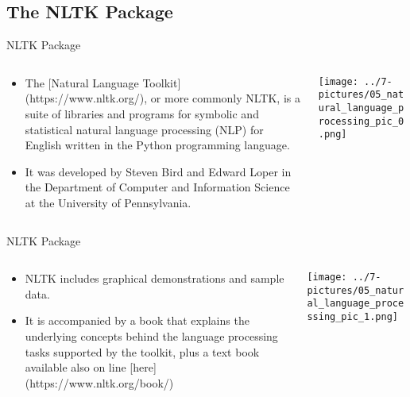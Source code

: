 \documentclass[11pt]{beamer}
\begin{document}
\subsection{The NLTK Package}
\begin{frame}{NLTK Package}
\begin{columns}[T] %
\begin{column}{.48\textwidth}
        \begin{itemize}
		\item The [Natural Language Toolkit](https://www.nltk.org/), or more commonly NLTK, is a suite of libraries and programs for symbolic and statistical natural language processing (NLP) for English written in the Python programming language.
		\item It was developed by Steven Bird and Edward Loper in the Department of Computer and Information Science at the University of Pennsylvania.
        \end{itemize}
\end{column}%
\hfill%
\begin{column}{.48\textwidth}
        \texttt{[image: ../7-pictures/05\_natural\_language\_processing\_pic\_0.png]}
\end{column}%
\end{columns}
\end{frame}
\begin{frame}{NLTK Package}
\begin{columns}[T] %
\begin{column}{.48\textwidth}
        \begin{itemize}
		\item NLTK includes graphical demonstrations and sample data. 
		\item It is accompanied by a book that explains the underlying concepts behind the language processing tasks supported by the toolkit, plus a text book available also on line [here](https://www.nltk.org/book/)
        \end{itemize}
\end{column}%
\hfill%
\begin{column}{.48\textwidth}
        \texttt{[image: ../7-pictures/05\_natural\_language\_processing\_pic\_1.png]}
\end{column}%
\end{columns}
\end{frame}
\end{document}
